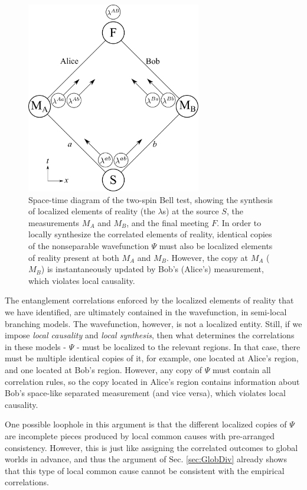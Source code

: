 \documentclass[a4paper]{article}
\begin{document}
\begin{figure}
    \centering
    \includegraphics[width = 3in]{Local_Synthesis.pdf}
    \caption{Space-time diagram of the two-spin Bell test, showing the synthesis of localized elements of reality (the $\lambda$s) at the source $S$, the measurements $M_A$ and $M_B$, and the final meeting $F$.  In order to locally synthesize the correlated elements of reality, identical copies of the nonseparable wavefunction $\Psi$ must also be localized elements of reality present at both $M_A$ and $M_B$.  However, the copy at $M_A$ ($M_B$) is instantaneously updated by Bob's (Alice's) measurement, which violates local causality.}
    \label{fig:Synthesis}
\end{figure}

The entanglement correlations enforced by the localized elements of reality that we have identified, are ultimately contained in the wavefunction, in semi-local branching models. The wavefunction, however, is not a localized entity. Still, if we impose \textit{local causality} and \textit{local synthesis}, then what determines the correlations in these models - $\Psi$ - must be localized to the relevant regions. In that case, there must be multiple identical copies of it, for example, one located at Alice's region, and one located at Bob's region. However, any copy of $\Psi$ must contain all correlation rules, so the copy located in Alice's region contains information about Bob's space-like separated measurement (and vice versa), which violates local causality.

One possible loophole in this argument is that the different localized copies of $\Psi$ are incomplete pieces produced by local common causes with pre-arranged consistency.  However, this is just like assigning the correlated outcomes to global worlds in advance, and thus the argument of Sec. \ref{sec:GlobDiv} already shows that this type of local common cause cannot be consistent with the empirical correlations.
\end{document}
